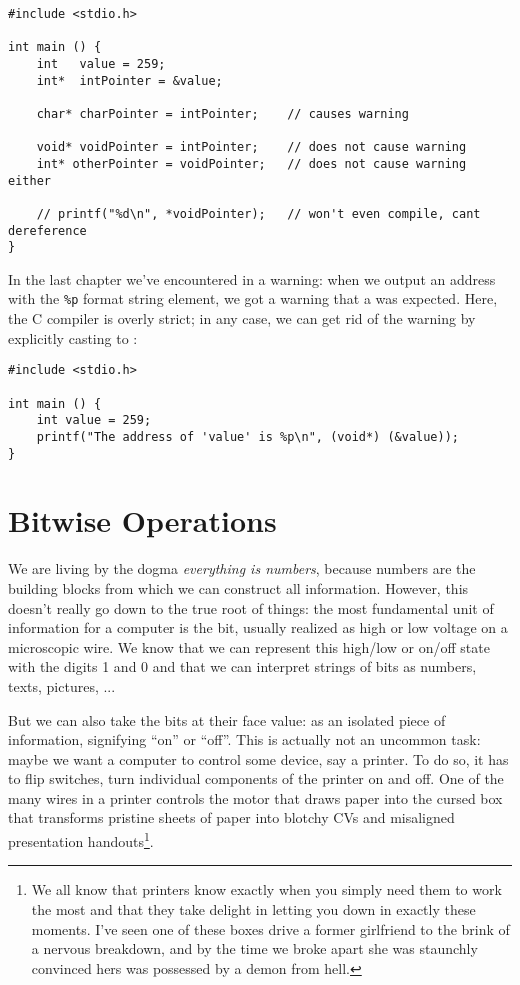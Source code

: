 {\begin{codebox}
\begin{verbatim}
#include <stdio.h>

int main () {
    int   value = 259;
    int*  intPointer = &value;
    
    char* charPointer = intPointer;    // causes warning
    
    void* voidPointer = intPointer;    // does not cause warning
    int* otherPointer = voidPointer;   // does not cause warning either
    
    // printf("%d\n", *voidPointer);   // won't even compile, cant dereference
}
\end{verbatim}
\end{codebox}

In the last chapter we've encountered  in a warning: when we output an address with the \texttt{\%p} format string element, we got a warning that a  was expected. Here, the C compiler is overly strict; in any case, we can get rid of the warning by explicitly casting to :

\begin{codebox}
\begin{verbatim}
#include <stdio.h>

int main () {
    int value = 259;
    printf("The address of 'value' is %p\n", (void*) (&value));
}
\end{verbatim}
\end{codebox}


\section{Bitwise Operations}
We are living by the dogma \emph{everything is numbers}, because numbers are the building blocks from which we can construct all information. However, this doesn't really go down to the true root of things: the most fundamental unit of information for a computer is the bit, usually realized as high or low voltage on a microscopic wire. We know that we can represent this high/low or on/off state with the digits 1 and 0 and that we can interpret strings of bits as numbers, texts, pictures, ...

But we can also take the bits at their face value: as an isolated piece of information, signifying \enquote{on} or \enquote{off}. This is actually not an uncommon task: maybe we want a computer to control some device, say a printer. To do so, it has to flip switches, turn individual components of the printer on and off. One of the many wires in a printer controls the motor that draws paper into the cursed box that transforms pristine sheets of paper into blotchy CVs and misaligned presentation handouts\footnote{We all know that printers know exactly when you simply need them to work the most and that they take delight in letting you down in exactly these moments. I've seen one of these boxes drive a former girlfriend to the brink of a nervous breakdown, and by the time we broke apart she was staunchly convinced hers was possessed by a demon from hell.}.

}
